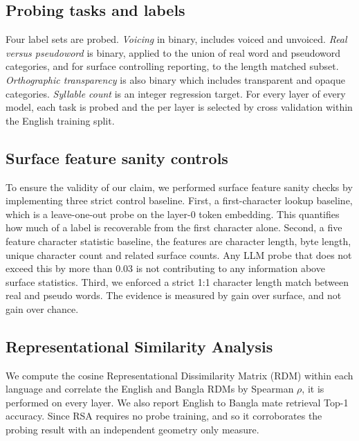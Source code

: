 \documentclass[preprint,12pt,authoryear]{elsarticle}
\begin{document}
\subsection{Probing tasks and labels}
Four label sets are probed. \emph{Voicing} in binary, includes voiced and unvoiced. \emph{Real versus pseudoword} is binary, applied to the union of real word and pseudoword categories, and for surface controlling reporting, to the length matched subset. \emph{Orthographic transparency} is also binary which includes transparent and opaque categories. \emph{Syllable count} is an integer regression target. For every layer of every model, each task is probed and the per layer is selected by cross validation within the English training split.

\subsection{Surface feature sanity controls}
To ensure the validity of our claim, we performed surface feature sanity checks by implementing three strict control baseline. First, a first-character lookup baseline, which is a leave-one-out probe on the layer-0 token embedding. This quantifies how much of a label is recoverable from the first character alone. Second, a five feature character statistic baseline, the features are character length, byte length, unique character count and related surface counts. Any LLM probe that does not exceed this by more than 0.03 is not contributing to any information above surface statistics. Third, we enforced a strict 1:1 character length match between real and pseudo words. The evidence is measured by gain over surface, and not gain over chance.

\subsection{Representational Similarity Analysis}
We compute the cosine Representational Dissimilarity Matrix (RDM) \citep{kriegeskorte2008rsa} within each language and correlate the English and Bangla RDMs by Spearman $\rho$, it is performed on every layer. We also report English to Bangla mate retrieval Top-1 accuracy. Since RSA requires no probe training, and so it corroborates the probing result with an independent geometry only measure.
\end{document}
